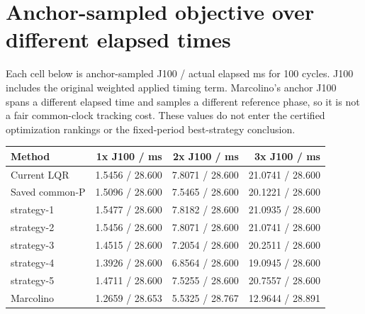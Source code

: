 \documentclass[11pt,a4paper]{article}
\begin{document}
\clearpage\section*{Anchor-sampled objective over different elapsed times}
Each cell below is anchor-sampled J100 / actual elapsed ms for 100 cycles. J100 includes the original weighted applied timing term. Marcolino's anchor J100 spans a different elapsed time and samples a different reference phase, so it is not a fair common-clock tracking cost. These values do not enter the certified optimization rankings or the fixed-period best-strategy conclusion.
\begin{center}\begin{tabular}{lrrr}
\toprule
Method & 1x J100 / ms & 2x J100 / ms & 3x J100 / ms \\
\midrule
Current LQR & 1.5456 / 28.600 & 7.8071 / 28.600 & 21.0741 / 28.600 \\
Saved common-P & 1.5096 / 28.600 & 7.5465 / 28.600 & 20.1221 / 28.600 \\
strategy-1 & 1.5477 / 28.600 & 7.8182 / 28.600 & 21.0935 / 28.600 \\
strategy-2 & 1.5456 / 28.600 & 7.8071 / 28.600 & 21.0741 / 28.600 \\
strategy-3 & 1.4515 / 28.600 & 7.2054 / 28.600 & 20.2511 / 28.600 \\
strategy-4 & 1.3926 / 28.600 & 6.8564 / 28.600 & 19.0945 / 28.600 \\
strategy-5 & 1.4711 / 28.600 & 7.5255 / 28.600 & 20.7557 / 28.600 \\
Marcolino & 1.2659 / 28.653 & 5.5325 / 28.767 & 12.9644 / 28.891 \\
\bottomrule
\end{tabular}\end{center}
\end{document}
